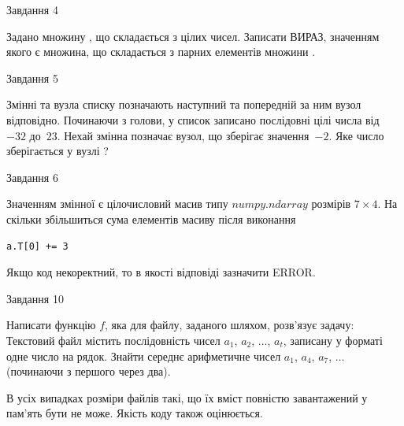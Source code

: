 \documentclass[12pt, ukrainian]{article}
\begin{document}
{               
{\begin{center}Завдання {4}\end{center}}
\vspace{-4mm}
Задано множину , що складається з цілих чисел. Записати ВИРАЗ, значенням якого є множина, що складається  з парних елементів множини .\par

\vspace{10mm}
               
{\begin{center}Завдання {5}\end{center}}
\vspace{-4mm}
Змінні  та  вузла списку позначають наступний та попередній за ним вузол відповідно. Починаючи з голови, у список записано послідовні цілі числа від~$-32$ до~$23$. Нехай змінна  позначає вузол, що зберігає значення~$-2$.
Яке число зберігається у вузлі  ?\par

               
{\begin{center}Завдання {6}\end{center}}
\vspace{-4mm}
Значенням змінної  є цілочисловий масив типу $numpy.ndarray$ розмірів $7{\times}4$. На скільки збільшиться сума елементів масиву  після виконання
\begin{verbatim}
a.T[0] += 3
\end{verbatim}


Якщо код некоректний, то в якості відповіді зазначити ERROR.\par

               
{\begin{center}Завдання {10}\end{center}}
\vspace{-4mm}

Написати функцію $f$, яка для файлу, заданого шляхом, розв’язує задачу:\\ Текстовий файл містить послідовність чисел $a_1$, $a_2$, $\ldots$, $a_t$, записану у форматі одне число на рядок. Знайти середнє арифметичне чисел $a_1$, $a_4$, $a_7$, $\ldots$ (починаючи з першого через два).

В усіх випадках розміри файлів такі, що їх вміст повністю завантажений у пам'ять бути не може. Якість коду також оцінюється.



\vspace{10mm}\par

}
\end{document}
